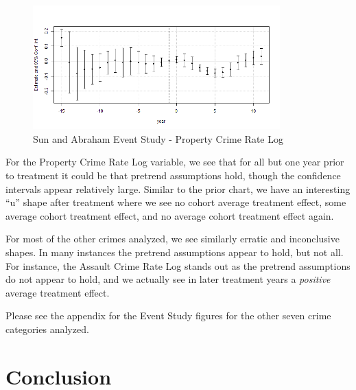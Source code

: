 \documentclass{article}
\begin{document}
\begin{figure}[H]
	\begin{center}
		\includegraphics[width=0.85\textwidth]{property}
	\end{center}
	\caption{Sun and Abraham Event Study - Property Crime Rate Log}
	\label{fig:property_graph}
\end{figure}

For the Property Crime Rate Log variable, we see that for all but one year prior to treatment it could be that pretrend assumptions hold, though the confidence intervals appear relatively large. Similar to the prior chart, we have an interesting ``u'' shape after treatment where we see no cohort average treatment effect, some average cohort treatment effect, and no average cohort treatment effect again.

For most of the other crimes analyzed, we see similarly erratic and inconclusive shapes. In many instances the pretrend assumptions appear to hold, but not all. For instance, the Assault Crime Rate Log stands out as the pretrend assumptions do not appear to hold, and we actually see in later treatment years a \emph{positive} average treatment effect.

Please see the appendix for the Event Study figures for the other seven crime categories analyzed.

\section{Conclusion}
\end{document}
